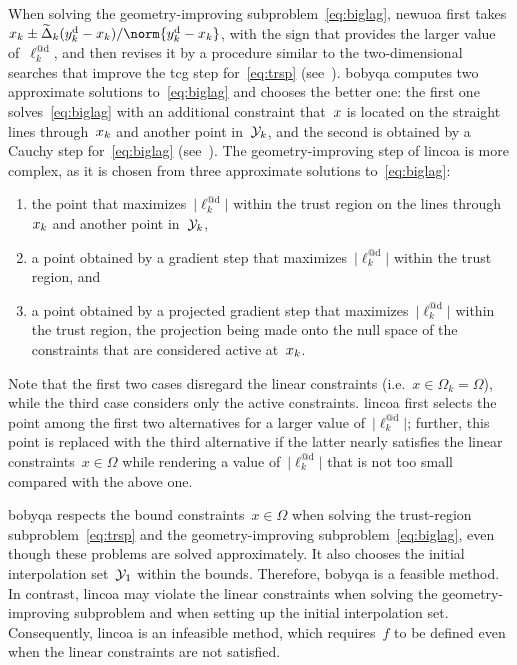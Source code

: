 \documentclass{article}
\numberwithin{equation}{section}
\theoremstyle{definition}
\theoremstyle{plain}
\theoremstyle{remark}
\newcommand*{\abs}[2][]{#1\lvert#2#1\rvert}
\newcommand{\drop}{{\text{d}}}
\newcommand{\fsetm}[1][k]{\Omega_{#1}}
\newcommand{\fset}{\Omega}
\newcommand{\iter}[1][k]{x\ifthenelse{\equal{#1}{}}{}{_{#1}}}
\newcommand{\obj}{f}
\newcommand{\radalt}[1][k]{\widetilde{\Delta}\ifthenelse{\equal{#1}{}}{}{_{#1}}}
\newcommand{\xpt}[1][k]{\mathcal{Y}\ifthenelse{\equal{#1}{}}{}{_{#1}}}
\begin{document}
When solving the geometry-improving subproblem~\eqref{eq:biglag}, \gls{newuoa} first takes\break $\iter \pm \radalt (y_k^\drop - \iter)/\norm{y_k^\drop -\iter}$, with the sign that provides the larger value of~$\ell_k^{@\drop}$, and then revises it by a procedure similar to the two-dimensional searches that improve the \gls{tcg} step for~\eqref{eq:trsp} (see~\cite[\S~6]{Powell_2006}).
\Gls{bobyqa} computes two approximate solutions to~\eqref{eq:biglag} and chooses the better one: the first one solves~\eqref{eq:biglag} with an additional constraint that~$\iter[]$ is located on the straight lines through~$\iter$ and another point in~$\xpt$, and the second is obtained by a Cauchy step for~\eqref{eq:biglag} (see~\cite[\S~3]{Powell_2009}).
The geometry-improving step of \gls{lincoa} is more complex, as it is chosen from three approximate solutions to~\eqref{eq:biglag}:
\begin{enumerate}
    \item the point that maximizes~$\abs{\ell_k^{@\drop}}$ within the trust region on the lines through~$\iter$ and another point in~$\xpt$,
    \item a point obtained by a gradient step that maximizes~$\abs{\ell_k^{@\drop}}$ within the trust region, and
    \item a point obtained by a projected gradient step that maximizes~$\abs{\ell_k^{@\drop}}$ within the trust region, the projection being made onto the null space of the constraints that are considered active at~$\iter$.
\end{enumerate}
Note that the first two cases disregard the linear constraints (i.e.~$x\in\fsetm = \fset$), while the third case considers only the active constraints.
\Gls{lincoa} first selects the point among the first two alternatives for a larger value of~$\abs{\ell_k^{@\drop}}$; further, this point is replaced with the third alternative if the latter nearly satisfies the linear constraints~$x\in\fset$ while rendering a value of~$\abs{\ell_k^{@\drop}}$ that is not too small compared with the above one.

\Gls{bobyqa} respects the bound constraints~$x\in \fset$ when solving the trust-region subproblem~\eqref{eq:trsp} and the geometry-improving subproblem~\eqref{eq:biglag}, even though these problems are solved approximately.
It also chooses the initial interpolation set~$\xpt[1]$ within the bounds.
Therefore, \gls{bobyqa} is a feasible method.
In contrast, \gls{lincoa} may violate the linear constraints when solving the geometry-improving subproblem and when setting up the initial interpolation set.
Consequently, \gls{lincoa} is an infeasible method, which requires~$\obj$ to be defined even when the linear constraints are not satisfied.
\end{document}
